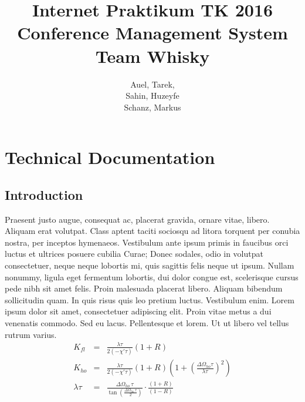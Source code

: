 \documentclass[nochapterpage,nopartpage,numbersubsubsec,bigchapter,colorback,accentcolor=tud9c]{tudreport}
\title{Internet Praktikum TK 2016\\ Conference Management System\\ Team Whisky}
\subtitle{Auel, Tarek,\\ Sahin, Huzeyfe\\ Schanz, Markus}
\begin{document}
\maketitle


\tableofcontents

\listoffigures
{}

\part{Technical Documentation}
\label{part:tech}

  \chapter{Introduction}
  \label{ch:tech:intro}

    Praesent justo augue, consequat ac, placerat gravida, ornare vitae, libero. Aliquam erat volutpat. Class aptent taciti sociosqu ad litora torquent per conubia nostra, per inceptos hymenaeos. Vestibulum ante ipsum primis in faucibus orci luctus et ultrices posuere cubilia Curae; Donec sodales, odio in volutpat consectetuer, neque neque lobortis mi, quis sagittis felis neque ut ipsum. Nullam nonummy, ligula eget fermentum lobortis, dui dolor congue est, scelerisque cursus pede nibh sit amet felis. Proin malesuada placerat libero. Aliquam bibendum sollicitudin quam. In quis risus quis leo pretium luctus. Vestibulum enim. Lorem ipsum dolor sit amet, consectetuer adipiscing elit. Proin vitae metus a dui venenatis commodo. Sed eu lacus. Pellentesque et lorem. Ut ut libero vel tellus rutrum varius.
      \begin{eqnarray}
        K_{fl}&=&\frac{\lambda\tau}{2(-\chi'\tau)}(1+R)\label{eqn.Kfl}\\
        K_{ho}&=&\frac{\lambda\tau}{2(-\chi'\tau)}(1+R)
          \left(1+\left(\frac{\Delta\Omega_{ho}\tau}{\lambda\tau}\right)^2\right)
          \label{eqn.Kho}\\
        \lambda\tau&=&
          \frac{\Delta\Omega_{ho}\,\tau}{\tan\left(\frac{\Delta\Omega_{ho}\,\tau}{2}
          \right)}\cdot\frac{(1+R)}{(1-R)}\label{eqn.lambda}
      \end{eqnarray}
\end{document}
